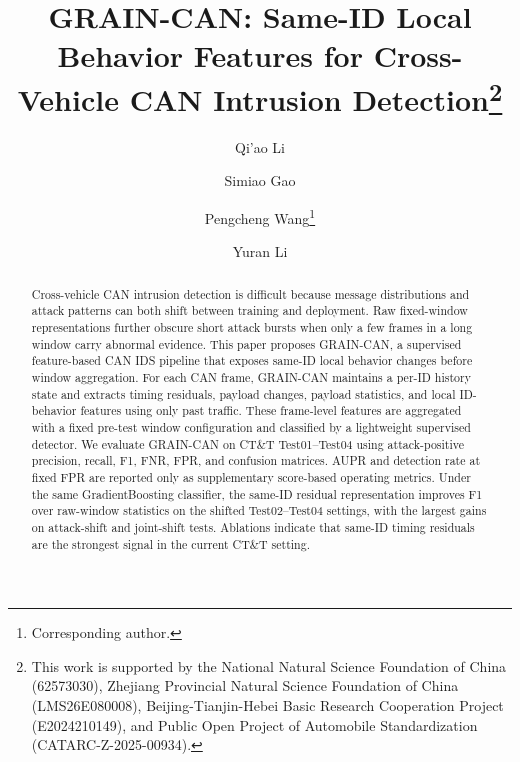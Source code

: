 \documentclass[runningheads]{llncs}
\newcommand{\method}{GRAIN-CAN}
\begin{document}
\raggedbottom

\title{\method{}: Same-ID Local Behavior Features for Cross-Vehicle CAN Intrusion Detection\thanks{This work is supported by the National Natural Science Foundation of China (62573030), Zhejiang Provincial Natural Science Foundation of China (LMS26E080008), Beijing-Tianjin-Hebei Basic Research Cooperation Project (E2024210149), and Public Open Project of Automobile Standardization (CATARC-Z-2025-00934).}}
\titlerunning{\method{}}
\author{Qi'ao Li \and Simiao Gao \and Pengcheng Wang\thanks{Corresponding author.} \and Yuran Li}
\maketitle

\begin{abstract}
Cross-vehicle CAN intrusion detection is difficult because message distributions and attack patterns can both shift between training and deployment. Raw fixed-window representations further obscure short attack bursts when only a few frames in a long window carry abnormal evidence. This paper proposes \method{}, a supervised feature-based CAN IDS pipeline that exposes same-ID local behavior changes before window aggregation. For each CAN frame, \method{} maintains a per-ID history state and extracts timing residuals, payload changes, payload statistics, and local ID-behavior features using only past traffic. These frame-level features are aggregated with a fixed pre-test window configuration and classified by a lightweight supervised detector. We evaluate \method{} on CT\&T Test01--Test04 using attack-positive precision, recall, F1, FNR, FPR, and confusion matrices. AUPR and detection rate at fixed FPR are reported only as supplementary score-based operating metrics. Under the same GradientBoosting classifier, the same-ID residual representation improves F1 over raw-window statistics on the shifted Test02--Test04 settings, with the largest gains on attack-shift and joint-shift tests. Ablations indicate that same-ID timing residuals are the strongest signal in the current CT\&T setting.
\end{abstract}
\end{document}
